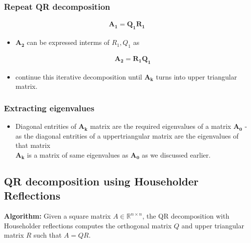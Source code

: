 \documentclass[journal]{IEEEtran}
\begin{document}
\subsubsection{Repeat QR decomposition}

\begin{align*}
    \mathbf{A_1=Q_1 R_1}
\end{align*}
\begin{itemize}
    \item $\mathbf{A_2}$ can be expressed interms of $R_{1}, Q_{1}$ as

\begin{align*}
    \mathbf{A_2 = R_{1} Q_{1}}
\end{align*}
   \item continue this iterative decomposition until $\mathbf{A_k}$ turns into upper triangular matrix.\\
\end{itemize}


\subsubsection{Extracting eigenvalues}
\begin{itemize}
    \item Diagonal entrities of $\mathbf{A_k}$ matrix are the required eigenvalues of a matrix $\mathbf{A_0}$ - as the diagonal entrities of a uppertriangular matrix are the eigenvalues of that matrix\\
    $\mathbf{A_k}$ is a matrix of same eigenvalues as $\mathbf{A_0}$ as we discussed earlier.\\
\end{itemize}
\subsection{QR decomposition using Householder Reflections}
\textbf{Algorithm:}
Given a square matrix \( A \in \mathbb{R}^{n \times n} \), the QR decomposition with Householder reflections computes the orthogonal matrix \( Q \) and upper triangular matrix \( R \) such that \( A = QR \).
\end{document}
